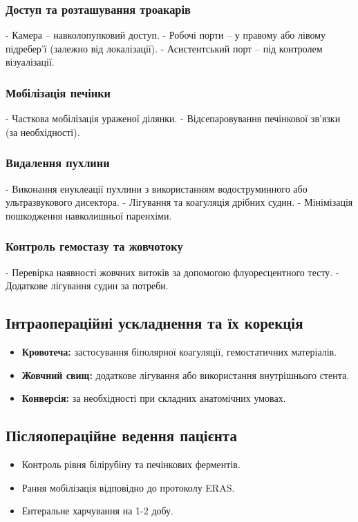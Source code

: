 \begin{refsection}
\subsubsection{Доступ та розташування троакарів}
- Камера – навколопупковий доступ.
- Робочі порти – у правому або лівому підребер’ї (залежно від локалізації).
- Асистентський порт – під контролем візуалізації.

\subsubsection{Мобілізація печінки}
- Часткова мобілізація ураженої ділянки.
- Відсепаровування печінкової зв’язки (за необхідності).

\subsubsection{Видалення пухлини}
- Виконання енуклеації пухлини з використанням водоструминного або ультразвукового дисектора.
- Лігування та коагуляція дрібних судин.
- Мінімізація пошкодження навколишньої паренхіми.

\subsubsection{Контроль гемостазу та жовчотоку}
- Перевірка наявності жовчних витоків за допомогою флуоресцентного тесту.
- Додаткове лігування судин за потреби.

\subsection{Інтраопераційні ускладнення та їх корекція}
\begin{itemize}
    \item \textbf{Кровотеча:} застосування біполярної коагуляції, гемостатичних матеріалів.
    \item \textbf{Жовчний свищ:} додаткове лігування або використання внутрішнього стента.
    \item \textbf{Конверсія:} за необхідності при складних анатомічних умовах.
\end{itemize}

\subsection{Післяопераційне ведення пацієнта}
\begin{itemize}
    \item Контроль рівня білірубіну та печінкових ферментів.
    \item Рання мобілізація відповідно до протоколу ERAS.
    \item Ентеральне харчування на 1-2 добу.
\end{itemize}


\end{refsection}
